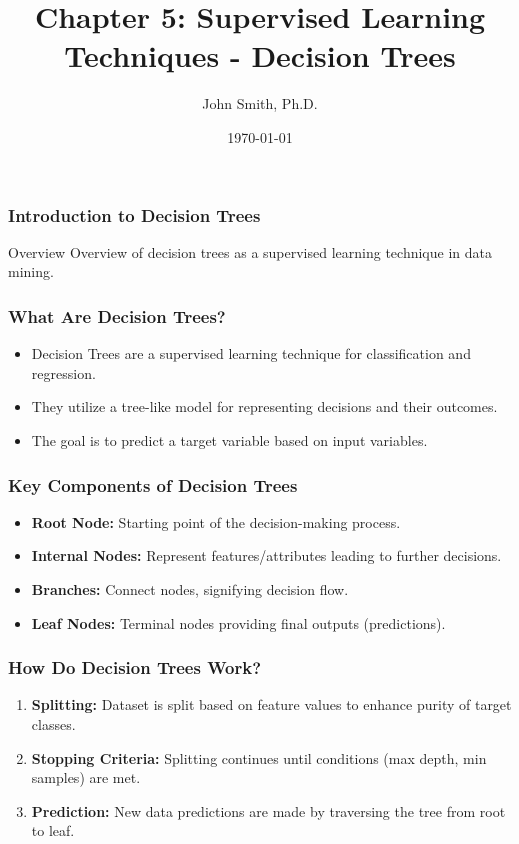 \documentclass[aspectratio=169]{beamer}
\title[Decision Trees]{Chapter 5: Supervised Learning Techniques - Decision Trees}
\author[J. Smith]{John Smith, Ph.D.}
\institute[University Name]{
  Department of Computer Science\\
  University Name\\
  \vspace{0.3cm}
  Email: email@university.edu\\
  Website: www.university.edu
}
\date{\today}
\begin{document}
\frame{\titlepage}

\begin{frame}[fragile]
    \frametitle{Introduction to Decision Trees}
    \begin{block}{Overview}
        Overview of decision trees as a supervised learning technique in data mining.
    \end{block}
\end{frame}

\begin{frame}[fragile]
    \frametitle{What Are Decision Trees?}
    \begin{itemize}
        \item Decision Trees are a supervised learning technique for classification and regression.
        \item They utilize a tree-like model for representing decisions and their outcomes.
        \item The goal is to predict a target variable based on input variables.
    \end{itemize}
\end{frame}

\begin{frame}[fragile]
    \frametitle{Key Components of Decision Trees}
    \begin{itemize}
        \item \textbf{Root Node:} Starting point of the decision-making process.
        \item \textbf{Internal Nodes:} Represent features/attributes leading to further decisions.
        \item \textbf{Branches:} Connect nodes, signifying decision flow.
        \item \textbf{Leaf Nodes:} Terminal nodes providing final outputs (predictions).
    \end{itemize}
\end{frame}

\begin{frame}[fragile]
    \frametitle{How Do Decision Trees Work?}
    \begin{enumerate}
        \item \textbf{Splitting:} Dataset is split based on feature values to enhance purity of target classes.
        \item \textbf{Stopping Criteria:} Splitting continues until conditions (max depth, min samples) are met.
        \item \textbf{Prediction:} New data predictions are made by traversing the tree from root to leaf.
    \end{enumerate}
\end{frame}
\end{document}
